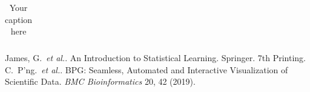 \documentclass[]{article}
\begin{document}
\begin{longtable}{| p{} | p{} |}




\caption{Your caption here} %
\label{tab:myfirstlongtable}
\end{longtable}





\begin{thebibliography}{}
  James, G.~{\textit{et al.}}. An Introduction to Statistical Learning. Springer. 7th Printing.
C.~P'ng.~{\textit{et al.}}. BPG: Seamless, Automated and Interactive Visualization of Scientific Data.
\textit{BMC Bioinformatics} 20, 42 (2019).\\

\end{thebibliography}
\end{document}
